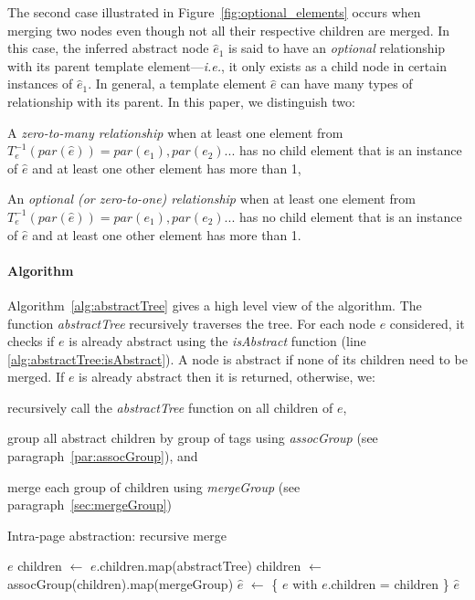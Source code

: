 The second case illustrated in Figure~\ref{fig:optional_elements} occurs when merging two nodes even though not all their respective children are merged.
In this case, the inferred abstract node $\hat{e}_1$ is said to have an \textit{optional} relationship with its parent template element---\emph{i.e.}, it only exists as a child node in certain instances of $\hat{e}_1$.
In general, a template element $\hat{e}$ can have many types of relationship with its parent.
In this paper, we distinguish two:
\begin{compactitem}
    \item A \emph{zero-to-many relationship} when at least one element from $T^{-1}_e(par(\hat{e})) = par(e_1), par(e_2)...$ has no child element that is an instance of $\hat{e}$ and at least one other element has more than 1,
    \item An \emph{optional (or zero-to-one) relationship} when at least one element from $T^{-1}_e(par(\hat{e})) = par(e_1), par(e_2)...$ has no child element that is an instance of $\hat{e}$ and at least one other element has more than 1.
\end{compactitem}

\paragraph{Algorithm}
Algorithm~\ref{alg:abstractTree} gives a high level view of the algorithm.
The function \emph{abstractTree} recursively traverses the tree.
For each node $e$ considered, it checks if $e$ is already abstract using the \emph{isAbstract} function (line \ref{alg:abstractTree:isAbstract}).
A node is abstract if none of its children need to be merged.
If $e$ is already abstract then it is returned, otherwise, we:
\begin{compactenum}
  \item recursively call the \emph{abstractTree} function on all children of $e$,
  \item group all abstract children by group of tags using \emph{assocGroup} (see paragraph~\ref{par:assocGroup}), and
  \item merge each group of children using \emph{mergeGroup} (see paragraph~\ref{sec:mergeGroup})
\end{compactenum}

\begin{algorithm}
\caption{Intra-page abstraction: recursive merge}\label{alg:abstractTree}
\begin{algorithmic}[1]
      \label{alg:abstractTree:isAbstract}
      \State \Return $e$
    \Else
      \State children $\gets$ $e$.children.map(abstractTree)
      \State children $\gets$ assocGroup(children).map(mergeGroup)
      \State $\hat{e}$ $\gets$ \{ $e$ with $e$.children = children \}
      \State \Return $\hat{e}$
    \EndIf
  \EndFunction
\end{algorithmic}
\end{algorithm}

